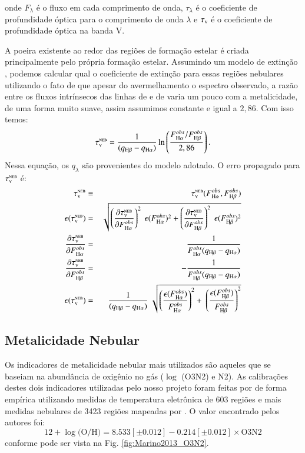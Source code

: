 \noindent onde $F_\lambda$ é o fluxo em cada comprimento de onda, $\tau_\lambda$ é o coeficiente de
profundidade óptica para o comprimento de onda $\lambda$ e $\tau_{\mathrm{\textsc{v}}}$ é o coeficiente de profundidade
óptica na banda V.

A poeira existente ao redor das regiões de formação estelar é criada principalmente pelo própria
formação estelar. Assumindo um modelo de extinção \citet[neste trabalho assumimos][]{CCM1989a},
podemos calcular qual o coeficiente de extinção para essas regiões nebulares utilizando o fato de
que apesar do avermelhamento o espectro observado, a razão entre os fluxos intrínsecos das linhas de
\Halpha e de \Hbeta varia um pouco com a metalicidade, de uma forma muito suave, assim assumimos
constante e igual a $2,86$. Com isso temos:
\begin{equation}
	\tauVN = \frac{1}{(q_{\Hbeta} - q_{\Halpha})} \ln \left( \frac{F_{\Halpha}^{obs}/F_{\Hbeta}^{obs}}{2,86} \right).
\end{equation}
\noindent Nessa equação, os $q_\lambda$ são provenientes do modelo adotado. O erro propagado para
$\tau_{\mathrm{\textsc{v}}}^{\mathrm{\textsc{neb}}}$ é:
\begin{eqnarray}
	\tauVN &\equiv& \tauVN(F_{\Halpha}^{obs}, F_{\Hbeta}^{obs}) \\
	\epsilon (\tauVN) &=& \sqrt{\left(\del{\tauVN}{F_{\Halpha}^{obs}}\right)^2 \
\epsilon (F_{\Halpha}^{obs})^2 + \left(\del{\tauVN}{F_{\Hbeta}^{obs}}\right)^2 \
\epsilon (F_{\Hbeta}^{obs})^2 } \\
	\del{\tauVN}{F_{\Halpha}^{obs}} &=& \frac{1}{F_{\Halpha}^{obs} (q_{\Hbeta} - q_{\Halpha})} \\
	\del{\tauVN}{F_{\Hbeta}^{obs}} &=& - \frac{1}{F_{\Hbeta}^{obs} (q_{\Hbeta} - q_{\Halpha})} \\
	\epsilon (\tauVN) &=& \frac{1}{(q_{\Hbeta} - q_{\Halpha})} \
\sqrt{\left(\frac{\epsilon (F_{\Halpha}^{obs})}{F_{\Halpha}^{obs}}\right)^2 + \
\left(\frac{\epsilon (F_{\Hbeta}^{obs})}{F_{\Hbeta}^{obs}}\right)^2 }
\end{eqnarray}

\subsection{Metalicidade Nebular}
\label{sec:emline:datacube:Zneb}

Os indicadores de metalicidade nebular mais utilizados são aqueles que se baseiam na abundância de
oxigênio no gás ($\log$ (O3N2) e N2). As calibrações destes dois indicadores utilizadas pelo nosso
projeto foram feitas por \citet{Marino.etal.2013a} de forma empírica utilizando medidas de
temperatura eletrônica de 603 regiões \Hii e mais medidas nebulares de 3423 regiões \Hii mapeadas
por \citet{Sanchez.etal.2013a}. O valor encontrado pelos autores foi:
\begin{equation}
	12 + \log \textrm{(O/H)} = 8.533[\pm0.012] - 0.214[\pm0.012]\times \textrm{O3N2}
\end{equation}
\noindent conforme pode ser vista na Fig. \ref{fig:Marino2013_O3N2}.

